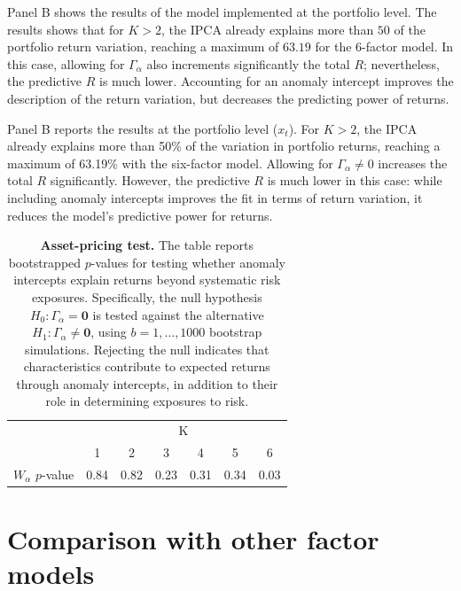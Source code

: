 \documentclass[
  12pt,
  a4paper,
  openany]{scrbook}
\begin{document}
Panel B shows the results of the model implemented at the portfolio
level. The results shows that for \(K>2\), the IPCA already explains
more than \(50%
\) of the portfolio return variation, reaching a maximum of \(63.19%
\) for the 6-factor model. In this case, allowing for \(\Gamma_\alpha\)
also increments significantly the total \(R\); nevertheless, the
predictive \(R\) is much lower. Accounting for an anomaly intercept
improves the description of the return variation, but decreases the
predicting power of returns.

Panel B reports the results at the portfolio level (\(x_t\)). For
\(K>2\), the IPCA already explains more than 50\% of the variation in
portfolio returns, reaching a maximum of 63.19\% with the six-factor
model. Allowing for \(\Gamma_\alpha \neq 0\) increases the total \(R\)
significantly. However, the predictive \(R\) is much lower in this case:
while including anomaly intercepts improves the fit in terms of return
variation, it reduces the model's predictive power for returns.

\begin{table}
\centering
\small
\caption[Asset-pricing test]%
{%
\textbf{Asset-pricing test.}
The table reports bootstrapped $p$-values for testing whether anomaly intercepts explain returns beyond systematic risk exposures. Specifically, the null hypothesis $H_{0}: \Gamma_{\alpha} = \mathbf{0}$ is tested against the alternative $H_{1}: \Gamma_{\alpha} \neq \mathbf{0}$, using $b = 1, \dots, 1000$ bootstrap simulations. Rejecting the null indicates that characteristics contribute to expected returns through anomaly intercepts, in addition to their role in determining exposures to risk.
}
\label{tbl-alphatest}
\vspace{5pt} %
\begin{tabular}{lcccccc}
\toprule
 & \multicolumn{6}{c}{K} \\
\cmidrule(lr){2-7}
 &  1 & 2 & 3 & 4 & 5 & 6 \\
\midrule\addlinespace[2.5pt]
$W_\alpha$ $p$-value  & 0.84 & 0.82 & 0.23 & 0.31 & 0.34 & 0.03 \\
\bottomrule
\end{tabular}
\end{table}

\section{Comparison with other factor
models}\label{comparison-with-other-factor-models}
\end{document}
